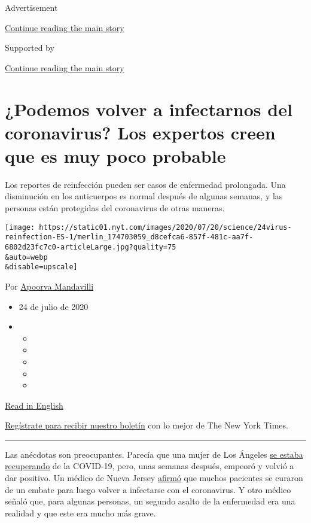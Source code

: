Advertisement

\protect\hyperlink{after-top}{Continue reading the main story}

Supported by

\protect\hyperlink{after-sponsor}{Continue reading the main story}

\hypertarget{podemos-volver-a-infectarnos-del-coronavirus-los-expertos-creen-que-es-muy-poco-probable}{%
\section{¿Podemos volver a infectarnos del coronavirus? Los expertos
creen que es muy poco
probable}\label{podemos-volver-a-infectarnos-del-coronavirus-los-expertos-creen-que-es-muy-poco-probable}}

Los reportes de reinfección pueden ser casos de enfermedad prolongada.
Una disminución en los anticuerpos es normal después de algunas semanas,
y las personas están protegidas del coronavirus de otras maneras.

\texttt{[image: https://static01.nyt.com/images/2020/07/20/science/24virus-reinfection-ES-1/merlin\_174703059\_d8cefca6-857f-481c-aa7f-6802d23fc7c0-articleLarge.jpg?quality=75\\\&auto=webp\\\&disable=upscale]}

Por \href{https://www.nytimes.com/by/apoorva-mandavilli}{Apoorva
Mandavilli}

\begin{itemize}
\item
  24 de julio de 2020
\item
  \begin{itemize}
  \item
  \item
  \item
  \item
  \item
  \end{itemize}
\end{itemize}

\href{https://www.nytimes.com/2020/07/22/health/covid-antibodies-herd-immunity.html}{Read
in English}

\href{https://www.nytimes.com/newsletters/el-times}{Regístrate para
recibir nuestro boletín} con lo mejor de The New York Times.

\begin{center}\rule{0.5\linewidth}{\linethickness}\end{center}

Las anécdotas son preocupantes. Parecía que una mujer de Los Ángeles
\href{https://www.foxla.com/news/southern-california-woman-tests-positive-for-covid-19-for-second-time-after-initial-recovery}{se
estaba recuperando} de la COVID-19, pero, unas semanas después, empeoró
y volvió a dar positivo. Un médico de Nueva Jersey
\href{https://dailyvoice.com/new-jersey/monmouth/news/central-jersey-doctor-reports-patients-reinfected-with-coronavirus/790555/}{afirmó}
que muchos pacientes se curaron de un embate para luego volver a
infectarse con el coronavirus. Y otro médico señaló que, para algunas
personas, un segundo asalto de la enfermedad era una realidad y que este
era mucho más grave.

